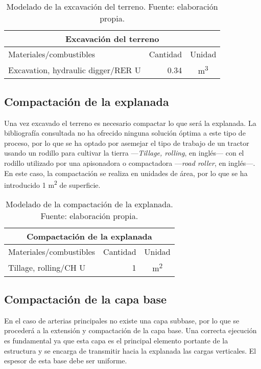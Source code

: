 \begin{table}[!htb]
\centering
\begin{tabular}{p{8cm}rc}
\toprule
\multicolumn{3}{c}{Excavación del terreno}\\
\midrule
Materiales/combustibles & Cantidad & Unidad\\
\midrule
Excavation, hydraulic digger/RER U & 0.34 & \si{m^3}\\
\bottomrule
\end{tabular}
\caption[Modelado de la excavación del terreno.]{Modelado de la excavación del terreno. Fuente: elaboración propia.}
\label{modeladoexcavacion}
\end{table}

\subsection{Compactación de la explanada}

Una vez excavado el terreno es necesario compactar lo que será la explanada. La bibliografía consultada no ha ofrecido ninguna solución óptima a este tipo de proceso, por lo que se ha optado por asemejar el tipo de trabajo de un tractor usando un rodillo para cultivar la tierra —\textit{Tillage, rolling}, en inglés— con el rodillo utilizado por una apisonadora o compactadora —\textit{road roller}, en inglés—. En este caso, la compactación se realiza en unidades de área, por lo que se ha introducido 1 \si{m^2} de superficie.

\begin{table}[!htb]
\centering
\begin{tabular}{p{8cm}rc}
\toprule
\multicolumn{3}{c}{Compactación de la explanada}\\
\midrule
Materiales/combustibles & Cantidad & Unidad\\
\midrule
Tillage, rolling/CH U & 1 & \si{m^2}\\
\bottomrule
\end{tabular}
\caption[Modelado de la compactación de la explanada.]{Modelado de la compactación de la explanada. Fuente: elaboración propia.}
\label{modeladoexplanada}
\end{table}

\subsection{Compactación de la capa base}

En el caso de arterias principales no existe una capa subbase, por lo que se procederá a la extensión y compactación de la capa base. Una correcta ejecución es fundamental ya que esta capa es el principal elemento portante de la estructura y se encarga de transmitir hacia la explanada las cargas verticales. El espesor de esta base debe ser uniforme.

